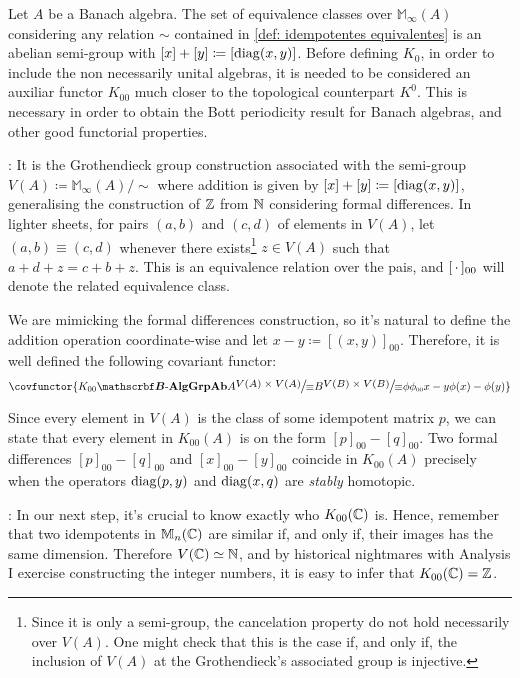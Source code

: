 \begin{definicao}
Let $A$ be a Banach algebra. The set of equivalence classes over $\mathbb M_\infty(A)$ considering any relation $\sim$ contained in \ref{def: idempotentes equivalentes} is an abelian semi-group with $[x]+[y] \coloneqq [\operatorname{diag}(x,y)]$. Before defining $K_0$, in order to include the non necessarily unital algebras, it is needed to be considered an auxiliar functor $K_{00}$ much closer to the topological counterpart $K^0$. This is necessary in order to obtain the Bott periodicity result for Banach algebras, and other good functorial properties.

\begin{itroman}
\item \textbf{}: It is the Grothendieck group construction associated with the semi-group $V({A}) \coloneqq \mathbb M_\infty\left({A}\right)/{\sim}$ where addition is given by $[x]+ [y] \coloneqq [\operatorname{diag}(x,y)]$, generalising the construction of $\operatorname{\mathbb{Z}}$ from $\operatorname{\mathbb{N}}$ considering formal differences. In lighter sheets, for pairs $(a,b)$ and $(c,d)$ of elements in $V(A)$, let $(a,b) \equiv (c,d)$ whenever there exists\footnote{Since it is only a semi-group, the cancelation property do not hold necessarily over $V(A)$. One might check that this is the case if, and only if, the inclusion of $V(A)$ at the Grothendieck's associated group is injective.} $z \in V(A)$ such that $a+d+z = c+b+z$. This is an equivalence relation over the pais, and $[\operatorname{\,\cdot\,}]_{00}$ will denote the related equivalence class. 

We are mimicking the formal differences construction, so it's natural to define the addition operation coordinate-wise and let $x-y \coloneqq [(x,y)]_{00}$. Therefore, it is well defined the following covariant functor:
\begin{equation*}
    \covfunctor{{K_{00}}{\BAlg}{\Ab{\Grp}}{A}{\mfrac{V(A)\times V(A)}{\equiv}}{B}{\mfrac{V(B)\times V(B)}{\equiv}}{\phi}{\sub\phi{00}}{x-y}{\phi(x)-\phi(y)}}
\end{equation*}

Since every element in $V(A)$ is the class of some idempotent matrix $p$, we can state that every element in $K_{00}(A)$ is on the form $[p]_{00} - [q]_{00}$. Two formal differences $[p]_{00}-[q]_{00}$ and $[x]_{00}-[y]_{00}$ coincide in $K_{00}(A)$ precisely when the operators $\operatorname{diag}(p,y)$ and $\operatorname{diag}(x,q)$ are \textit{stably} homotopic. 
\item \textbf{}: In our next step, it's crucial to know exactly who $K_{00}(\operatorname{\mathbb{C}})$ is. Hence, remember that two idempotents in $\mathbb M_n(\operatorname{\mathbb{C}})$ are similar if, and only if, their images has the same dimension. Therefore $V(\operatorname{\mathbb{C}}) \simeq \operatorname{\mathbb{N}}$, and by historical nightmares with Analysis I exercise constructing the integer numbers, it is easy to infer that $K_{00}(\operatorname{\mathbb{C}}) = \operatorname{\mathbb{Z}}$. 


\end{itroman}
\end{definicao}
